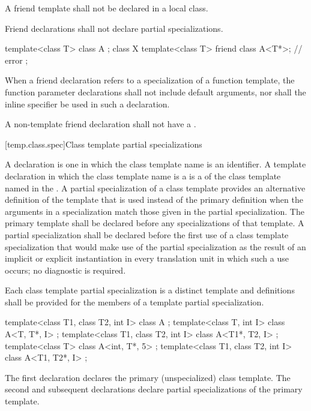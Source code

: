 \pnum
A friend template shall not be declared in a local class.

\pnum
Friend declarations shall not declare partial specializations.
\begin{example}

\begin{codeblock}
template<class T> class A { };
class X {
  template<class T> friend class A<T*>;         // error
};
\end{codeblock}
\end{example}

\pnum
When a friend declaration refers to a specialization of a function
template, the function parameter declarations shall not include
default arguments, nor shall the inline specifier be used in such a
declaration.

\pnum
A non-template friend declaration shall not have a .

[temp.class.spec]{Class template partial specializations}

\pnum
{}%
%
A
declaration is one in which the class template name is an
identifier.
A template declaration in which the class template name is a
is a
of the class template named in the
.
A partial specialization of a class template provides an alternative definition
of the template that is used instead of the primary definition when the
arguments in a specialization match those given in the partial
specialization.
The primary template shall be declared before any specializations of
that template.
A partial specialization shall be declared before the first use of a class template
specialization that would make use of the partial specialization as the result of
an implicit or explicit instantiation in every translation unit in which such a use
occurs; no diagnostic is required.

\pnum
Each class template partial specialization is a distinct template and
definitions shall be provided for the members of a template partial
specialization.

\pnum
\begin{example}
\begin{codeblock}
template<class T1, class T2, int I> class A             { };
template<class T, int I>            class A<T, T*, I>   { };
template<class T1, class T2, int I> class A<T1*, T2, I> { };
template<class T>                   class A<int, T*, 5> { };
template<class T1, class T2, int I> class A<T1, T2*, I> { };
\end{codeblock}

The first declaration declares the primary (unspecialized) class template.
The second and subsequent declarations declare partial specializations of
the primary template.
\end{example}

